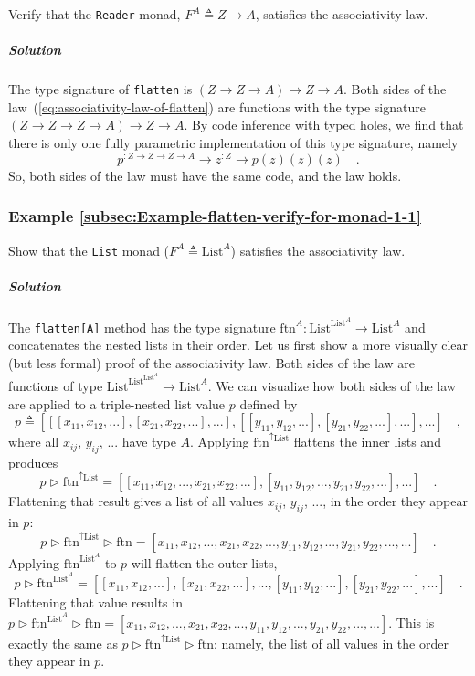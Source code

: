 Verify that the \lstinline!Reader! monad, $F^{A}\triangleq Z\rightarrow A$,
satisfies the associativity law.

\subparagraph{Solution}

The type signature of \lstinline!flatten! is $\left(Z\rightarrow Z\rightarrow A\right)\rightarrow Z\rightarrow A$.
Both sides of the law~(\ref{eq:associativity-law-of-flatten}) are
functions with the type signature $(Z\rightarrow Z\rightarrow Z\rightarrow A)\rightarrow Z\rightarrow A$.
By code inference with typed holes, we find that there is only one
fully parametric implementation of this type signature, namely
\[
p^{:Z\rightarrow Z\rightarrow Z\rightarrow A}\rightarrow z^{:Z}\rightarrow p(z)(z)(z)\quad.
\]
So, both sides of the law must have the same code, and the law holds.

\subsubsection{Example \label{subsec:Example-flatten-verify-for-monad-1-1}\ref{subsec:Example-flatten-verify-for-monad-1-1}}

Show that the \lstinline!List! monad ($F^{A}\triangleq\text{List}^{A}$)
satisfies the associativity law.

\subparagraph{Solution}

The \lstinline!flatten[A]! method has the type signature $\text{ftn}^{A}:\text{List}^{\text{List}^{A}}\rightarrow\text{List}^{A}$
and concatenates the nested lists in their order. Let us first show
a more visually clear (but less formal) proof of the associativity
law. Both sides of the law are functions of type $\text{List}^{\text{List}^{\text{List}^{A}}}\rightarrow\text{List}^{A}$.
We can visualize how both sides of the law are applied to a triple-nested
list value $p$ defined by
\[
p\triangleq\left[\left[\left[x_{11},x_{12},...\right],\left[x_{21},x_{22},...\right],...\right],\left[\left[y_{11},y_{12},...\right],\left[y_{21},y_{22},...\right],...\right],...\right]\quad,
\]
where all $x_{ij}$, $y_{ij}$, $...$ have type $A$. Applying $\text{ftn}^{\uparrow\text{List}}$
flattens the inner lists and produces
\[
p\triangleright\text{ftn}^{\uparrow\text{List}}=\left[\left[x_{11},x_{12},...,x_{21},x_{22},...\right],\left[y_{11},y_{12},...,y_{21},y_{22},...\right],...\right]\quad.
\]
Flattening that result gives a list of all values $x_{ij}$, $y_{ij}$,
..., in the order they appear in $p$:
\[
p\triangleright\text{ftn}^{\uparrow\text{List}}\triangleright\text{ftn}=\left[x_{11},x_{12},...,x_{21},x_{22},...,y_{11},y_{12},...,y_{21},y_{22},...,...\right]\quad.
\]
Applying $\text{ftn}^{\text{List}^{A}}$ to $p$ will flatten the
outer lists,
\[
p\triangleright\text{ftn}^{\text{List}^{A}}=\left[\left[x_{11},x_{12},...\right],\left[x_{21},x_{22},...\right],...,\left[y_{11},y_{12},...\right],\left[y_{21},y_{22},...\right],...\right]\quad.
\]
Flattening that value results in $p\triangleright\text{ftn}^{\text{List}^{A}}\triangleright\text{ftn}=\left[x_{11},x_{12},...,x_{21},x_{22},...,y_{11},y_{12},...,y_{21},y_{22},...,...\right]$.
This is exactly the same as $p\triangleright\text{ftn}^{\uparrow\text{List}}\triangleright\text{ftn}$:
namely, the list of all values in the order they appear in $p$.

